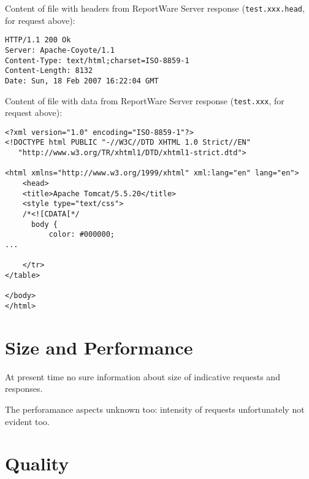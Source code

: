 \documentclass[a4paper,twoside]{article}
\begin{document}
Content of file with headers from ReportWare Server response (\verb|test.xxx.head|, for
request above):
\begin{verbatim}
HTTP/1.1 200 Ok
Server: Apache-Coyote/1.1
Content-Type: text/html;charset=ISO-8859-1
Content-Length: 8132
Date: Sun, 18 Feb 2007 16:22:04 GMT

\end{verbatim}

Content of file with data from ReportWare Server response (\verb|test.xxx|, for
request above):
\begin{verbatim}
<?xml version="1.0" encoding="ISO-8859-1"?>
<!DOCTYPE html PUBLIC "-//W3C//DTD XHTML 1.0 Strict//EN"
   "http://www.w3.org/TR/xhtml1/DTD/xhtml1-strict.dtd">

<html xmlns="http://www.w3.org/1999/xhtml" xml:lang="en" lang="en">
    <head>
    <title>Apache Tomcat/5.5.20</title>
    <style type="text/css">
    /*<![CDATA[*/
      body {
          color: #000000;
...

    </tr>
</table>

</body>
</html>
\end{verbatim}



\section{Size and Performance\label{SizePerf}}


At present time no sure information about size of indicative requests and
responses.

The perforamance aspects unknown too: intensity of requests unfortunately
not evident too.

\section{Quality\label{Quality}}

\end{document}
